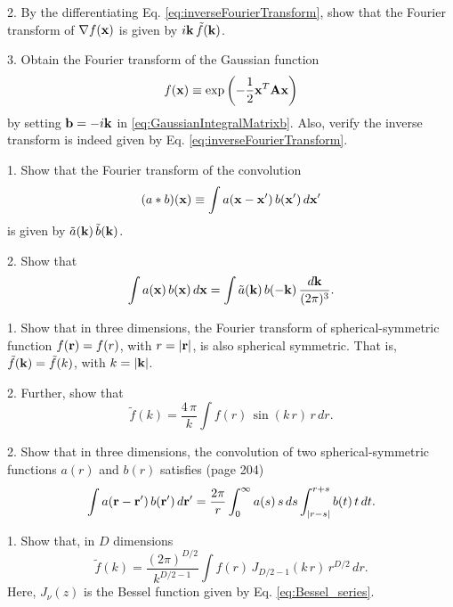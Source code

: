 \documentclass{book}
\begin{document}
2. By the differentiating Eq. \eqref{eq:inverseFourierTransform},
show that the Fourier transform of $\nabla f(\boldsymbol{\mathbf{x}})$ is given by $i\boldsymbol{\mathbf{k}} \, \tilde f(\boldsymbol{\mathbf{k}})$.

3. Obtain the Fourier transform of the Gaussian function
\[
  f(\boldsymbol{\mathbf{x}}) \equiv \exp\left( - \frac{1}{2} \boldsymbol{\mathbf{x}}^T \boldsymbol{\mathbf{A}} \boldsymbol{\mathbf{x}} \right)
\]
by setting $\boldsymbol{\mathbf{b}} = -i \boldsymbol{\mathbf{k}}$ in \eqref{eq:GaussianIntegralMatrixb}.
%
Also, verify the inverse transform
is indeed given by Eq. \eqref{eq:inverseFourierTransform}.





1. Show that the Fourier transform of the convolution
\begin{equation}
  (a*b)(\boldsymbol{\mathbf{x}})
\equiv
  \int a(\boldsymbol{\mathbf{x}} - \boldsymbol{\mathbf{x}}') \, b(\boldsymbol{\mathbf{x}}') \, d\boldsymbol{\mathbf{x}}'
  \label{eq:convolution}
\end{equation}
is given by $\tilde{a}(\boldsymbol{\mathbf{k}}) \, \tilde{b}(\boldsymbol{\mathbf{k}})$.

2. Show that
\begin{equation}
  \int a(\boldsymbol{\mathbf{x}}) \, b(\boldsymbol{\mathbf{x}}) \, d\boldsymbol{\mathbf{x}}
=
  \int \tilde{a}(\boldsymbol{\mathbf{k}}) \, b(-\boldsymbol{\mathbf{k}}) \, \frac{ d \boldsymbol{\mathbf{k}} }{(2\pi)^3}.
\end{equation}







1. Show that in three dimensions,
the Fourier transform of spherical-symmetric function
$f(\boldsymbol{\mathbf{r}}) = f(r)$, with $r = |\boldsymbol{\mathbf{r}}|$,
is also spherical symmetric.
%
That is, $\tilde f(\boldsymbol{\mathbf{k}}) = \tilde f(k)$, with $k = |\boldsymbol{\mathbf{k}}|$.

2. Further, show that
\begin{equation}
  \tilde f(k)
=
\frac{ 4 \, \pi } {k}
  \int
  f(r) \,
  \sin(k\,r) \,
  r \,
  dr.
  \label{eq:FourierTransformSpherical3D}
\end{equation}

2. Show that in three dimensions,
the convolution of
two spherical-symmetric functions $a(r)$ and $b(r)$
satisfies\cite{hill} (page 204)
\[
  \int a(\boldsymbol{\mathbf{r}} - \boldsymbol{\mathbf{r}}') \, b(\boldsymbol{\mathbf{r}}') \, d\boldsymbol{\mathbf{r}}'
=
  \frac{2\pi}{r}
  \int_0^\infty a(s) \, s \, ds
  \int_{|r-s|}^{r+s} b(t) \, t \, dt.
\]






1. Show that, in $D$ dimensions
\begin{equation}
  \tilde f(k)
=
  \frac{(2 \pi)^{D/2}} {k^{D/2 - 1}}
  \int
  f(r) \,
  J_{D/2-1}(k\,r) \,
  r^{D/2} \,
  dr.
  \label{eq:FourierTransformSpherical}
\end{equation}
Here, $J_\nu(z)$ is the Bessel function
given by Eq. \eqref{eq:Bessel_series}.
\end{document}
